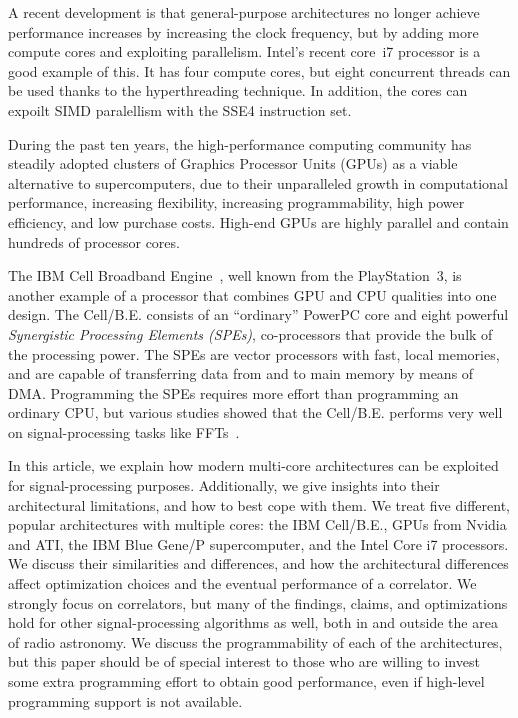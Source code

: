 \documentclass{article}
\begin{document}
A recent development is that general-purpose architectures no longer
achieve performance increases by increasing the clock frequency, but
by adding more compute cores and exploiting parallelism.  Intel's
recent core~i7 processor is a good example of this. It has four
compute cores, but eight concurrent threads can be used thanks to the
hyperthreading technique. In addition, the cores can expoilt SIMD
paralellism with the SSE4 instruction set.

During the past ten years, the high-performance computing community has
steadily adopted clusters of Graphics Processor Units (GPUs) as a viable
alternative to supercomputers, due to their unparalleled growth in
computational performance, increasing flexibility, increasing programmability,
high power efficiency, and low purchase costs.
High-end GPUs are highly parallel and contain hundreds of processor cores.

The IBM Cell Broadband Engine~\cite{Gschwind:06}, well known from the
PlayStation~3, is another example of a processor that combines GPU and CPU
qualities into one design.
The Cell/B.E. consists of an ``ordinary'' PowerPC core and eight powerful
\emph{Synergistic Processing Elements (SPEs)}, co-processors that provide
the bulk of the processing power.
The SPEs are vector processors with fast, local memories, and are capable
of transferring data from and to main memory by means of DMA.
Programming the SPEs requires more effort than programming an ordinary CPU,
but various studies showed that the Cell/B.E. performs very well on
signal-processing tasks like FFTs~\cite{fftc}.

In this article, we explain how modern multi-core architectures can be
exploited for signal-processing purposes.  Additionally, we give
insights into their architectural limitations, and how to best cope
with them.  We treat five different, popular architectures with
multiple cores: the IBM Cell/B.E., GPUs from Nvidia and ATI, the IBM
Blue Gene/P supercomputer, and the Intel Core i7 processors.  We discuss their
similarities and differences, and how the architectural differences
affect optimization choices and the eventual performance of a
correlator.  We strongly focus on correlators, but many of the
findings, claims, and optimizations hold for other signal-processing
algorithms as well, both in and outside the area of radio astronomy.
We discuss the programmability of each of the architectures, but this
paper should be of special interest to those who are willing to invest
some extra programming effort to obtain good performance, even if
high-level programming support is not available.
\end{document}
